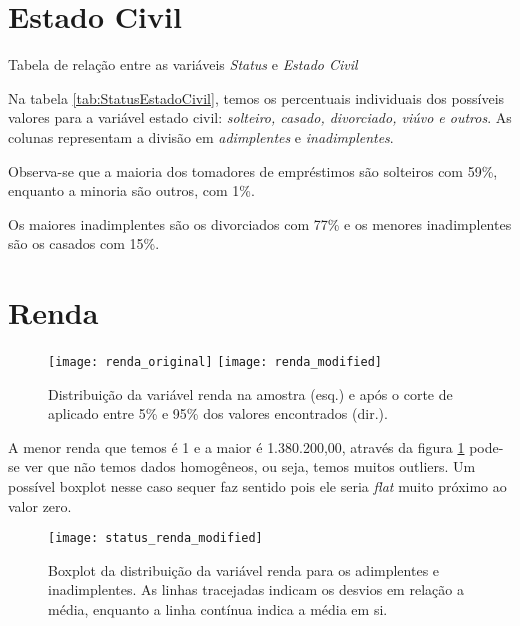 \clearpage

\section{Estado Civil}

\begin{table}[h]
\centering

\caption{\label{tab:StatusEstadoCivil}Tabela de relação entre as variáveis \emph{Status
}e \emph{Estado Civil}}
\end{table}

Na tabela \ref{tab:StatusEstadoCivil}, temos os percentuais individuais dos possíveis valores para a variável estado civil: \emph{solteiro, casado, divorciado, viúvo e outros}. As colunas representam a divisão em \emph{adimplentes} e \emph{inadimplentes}.

Observa-se que a maioria dos tomadores de empréstimos são solteiros com 59\%, enquanto a minoria são outros, com 1\%.

Os maiores inadimplentes são os divorciados com 77\% e os menores inadimplentes são os casados com 15\%.

\clearpage

\section{Renda}

\begin{center}
\begin{figure}[h]
\begin{centering}
\texttt{[image: renda\_original]}
\texttt{[image: renda\_modified]}
\par\end{centering}
\caption{\label{fig:RendaOriginal}Distribuição da variável renda na amostra (esq.) e após o corte de aplicado entre 5\% e 95\% dos valores encontrados (dir.).}
\end{figure}
\vspace*{-40pt}
\par\end{center}

A menor renda que temos é 1 e a maior é 1.380.200,00, através da figura \ref{fig:RendaOriginal}
pode-se ver que não temos dados homogêneos, ou seja, temos muitos outliers. Um possível boxplot nesse caso sequer faz sentido
pois ele seria \emph{flat} muito próximo ao valor zero.

\begin{center}
\begin{figure}
\begin{centering}
\texttt{[image: status\_renda\_modified]}
\par\end{centering}
\caption{\label{fig:StatusRendaMod}Boxplot da distribuição da variável renda para os adimplentes e inadimplentes. As linhas tracejadas indicam os desvios em relação a média, enquanto a linha contínua indica a média em si.}
\end{figure}
\vspace*{-40pt}
\par\end{center}


